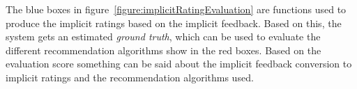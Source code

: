 The blue boxes in figure~\ref{figure:implicitRatingEvaluation} are functions
used to produce the implicit ratings based on the implicit feedback. Based on
this, the system gets an estimated \emph{ground truth}, which can be used to
evaluate the different recommendation algorithms show in the red boxes. Based
on the evaluation score something can be said about the implicit feedback
conversion to implicit ratings and the recommendation algorithms used.
